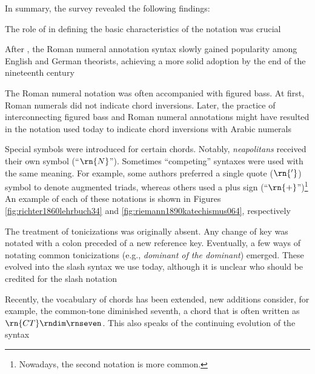 In summary, the survey revealed the following findings:

The role of \textcite{weber1817versuch} in defining the
basic characteristics of the notation was crucial


After \textcite{weber1817versuch}, the Roman numeral
annotation syntax slowly gained popularity among English and
German theorists, achieving a more solid adoption by the end
of the nineteenth century

 The Roman numeral notation was often accompanied with
figured bass. At first, Roman numerals did not indicate
chord inversions. Later, the practice of interconnecting
figured bass and Roman numeral annotations might have
resulted in the notation used today to indicate chord
inversions with Arabic numerals

Special symbols were introduced for certain chords. Notably,
\emph{neapolitans} received their own symbol (``$\rn{N}$'').
Sometimes ``competing'' syntaxes were used with the same
meaning. For example, some authors preferred a single quote
($\rn{'}$) symbol to denote augmented triads, whereas others
used a plus sign (``$\rn{+}$'')\footnote{Nowadays, the
second notation is more common.} An example of each of these
notations is shown in Figures
\ref{fig:richter1860lehrbuch34} and
\ref{fig:riemann1890katechismus064}, respectively

The treatment of tonicizations was originally absent. Any
change of key was notated with a colon preceded of a new
reference key. Eventually, a few ways of notating common
tonicizations (e.g., \emph{dominant of the dominant})
emerged. These evolved into the slash syntax we use today,
although it is unclear who should be credited for the slash
notation

Recently, the vocabulary of chords has been extended, new
additions consider, for example, the common-tone diminished
seventh, a chord that is often written as
$\rn{CT}\rndim\rnseven$. This also speaks of the continuing
evolution of the syntax
